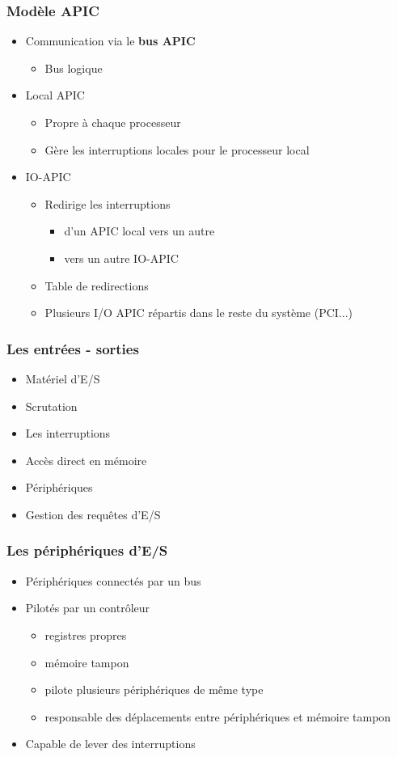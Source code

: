 \begin{frame}
\frametitle{Modèle APIC}
\begin{itemize}
\item Communication via le \textbf{bus APIC}
\begin{itemize}
\item Bus logique
\end{itemize}
\item Local APIC
\begin{itemize}
\item Propre à chaque processeur
\item Gère les interruptions locales pour le processeur local
\end{itemize}
\item IO-APIC
\begin{itemize}
\item Redirige les interruptions
\begin{itemize}
\item d'un APIC local vers un autre
\item vers un autre IO-APIC
\end{itemize}
\item Table de redirections
\item Plusieurs I/O APIC répartis dans le reste du système (PCI...)
\end{itemize}
\end{itemize}
\end{frame}


\begin{frame}
\frametitle{Les entrées - sorties}
\begin{itemize}
\item Matériel d'E/S
\item Scrutation
\item Les interruptions
\item Accès direct en mémoire
\item Périphériques
\item Gestion des requêtes d'E/S
\end{itemize}
\end{frame}



\begin{frame}
\frametitle{Les périphériques d’E/S}
\begin{itemize}
\item Périphériques connectés par un bus
\item Pilotés par un contrôleur
\begin{itemize}
\item registres propres
\item mémoire tampon
\item pilote plusieurs périphériques de même type
\item responsable des déplacements entre périphériques et mémoire tampon
\end{itemize}
\item Capable de lever des interruptions
\end{itemize}
\end{frame}


